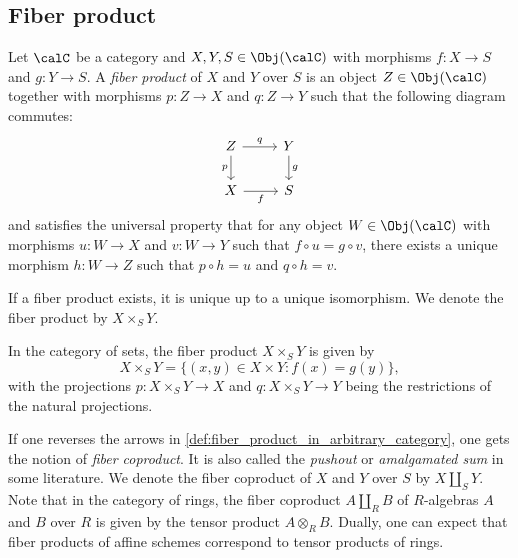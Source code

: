 \subsection{Fiber product}

    \begin{definition}\label{def:fiber_product_in_arbitrary_category}
        Let \(\calC\) be a category and \(X, Y, S \in \Obj(\calC)\) with morphisms \(f : X \to S\) and \(g : Y \to S\).
        A \emph{fiber product} of \(X\) and \(Y\) over \(S\) is an object \(Z \in \Obj(\calC)\) together with morphisms \(p : Z \to X\) and \(q : Z \to Y\) such that the following diagram commutes:
        \[
            \begin{tikzcd}
                Z \arrow[r, "q"] \arrow[d, "p"'] & Y \arrow[d, "g"] \\
                X \arrow[r, "f"'] & S
            \end{tikzcd}
        \]
        and satisfies the universal property that for any object \(W \in \Obj(\calC)\) with morphisms \(u : W \to X\) and \(v : W \to Y\) such that \(f \circ u = g \circ v\),
        there exists a unique morphism \(h : W \to Z\) such that \(p \circ h = u\) and \(q \circ h = v\).

        If a fiber product exists, it is unique up to a unique isomorphism.
        We denote the fiber product by \(X \times_S Y\).
    \end{definition}

    \begin{example}\label{eg:fiber_product_in_sets}
        In the category of sets, the fiber product \(X \times_S Y\) is given by
        \[ X \times_S Y = \{(x,y) \in X \times Y : f(x) = g(y)\}, \]
        with the projections \(p : X \times_S Y \to X\) and \(q : X \times_S Y \to Y\) being the restrictions of the natural projections.
    \end{example}

    \begin{remark}\label{rmk:fiber_coproduct_and_in_category_of_R_algebras}
        If one reverses the arrows in \cref{def:fiber_product_in_arbitrary_category}, one gets the notion of \emph{fiber coproduct}.
        It is also called the \emph{pushout} or \emph{amalgamated sum} in some literature.
        We denote the fiber coproduct of \(X\) and \(Y\) over \(S\) by \(X \amalg_S Y\).
        Note that in the category of rings, the fiber coproduct \(A \amalg_R B\) of \(R\)-algebras \(A\) and \(B\) over \(R\) is given by the tensor product \(A \otimes_R B\).
        Dually, one can expect that fiber products of affine schemes correspond to tensor products of rings.
    \end{remark}


